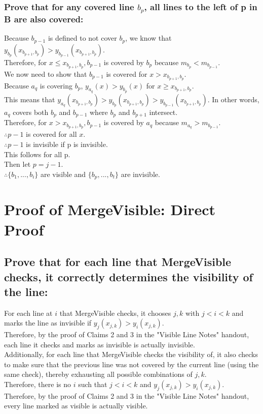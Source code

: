 \documentclass{article}
\begin{document}
    \subsubsection*{Prove that for any covered line $b_{p}$, all lines to the left of p in B are also covered:}
        Because $b_{p-1}$ is defined to not cover $b_p$, we know that $y_{b_{p}}(x_{b_{p+1}, b_{p}}) > y_{b_{p-1}}(x_{b_{p+1}, b_{p}})$.\\
        Therefore, for $x \leq x_{b_{p+1},b_{p}}, b_{p-1}$ is covered by $b_p$ because $m_{b_p} < m_{b_{p-1}}$.\\
        We now need to show that $b_{p-1}$ is covered for $x > x_{b_{p+1},b_{p}}$.\\
        Because $a_q$ is covering $b_p$, $y_{a_{q}}(x) > y_{b_{p}}(x)$ for $x \geq x_{b_{p+1},b_{p}}$.\\
        This means that $y_{a_{q}}(x_{b_{p+1}, b_{p}}) > y_{b_{p}}(x_{b_{p+1}, b_{p}}) > y_{b_{p-1}}(x_{b_{p+1}, b_{p}})$.  In other words, $a_{q}$ covers both $b_{p}$ and $b_{p-1}$ where $b_{p}$ and $b_{p+1}$ intersect.\\
        Therefore, for $x > x_{b_{p+1},b_{p}}, b_{p-1}$ is covered by $a_q$ because $m_{a_q} > m_{b_{p-1}}$.\\
        $\therefore p-1$ is covered for all $x$.\\
        $\therefore p-1$ is invisible if p is invisible.\\
        This follows for all p.\\
        Then let $p = j - 1$.\\
        $\therefore \{b_1,...,b_i\}$ are visible and $\{b_p,...,b_t\}$ are invisible.\\

\section*{Proof of MergeVisible: Direct Proof}

\subsection*{Prove that for each line that MergeVisible checks, it correctly determines the visibility of the line:}
For each line at $i$ that MergeVisible checks, it chooses $j, k$ with $j < i < k$ and marks the line as invisible if $y_j (x_{j,k}) > y_i(x_{j,k})$.\\
Therefore, by the proof of Claims 2 and 3 in the "Visible Line Notes" handout, each line it checks and marks as invisible is actually invisible.\\
Additionally, for each line that MergeVisible checks the visibility of, it also checks to make sure that the previous line was not covered by the current line (using the same check), thereby exhausting all possible combinations of $j, k$.\\
Therefore, there is no $i$ such that $j < i < k$ and $y_j (x_{j,k}) > y_i(x_{j,k})$.\\
Therefore, by the proof of Claims 2 and 3 in the "Visible Line Notes" handout, every line marked as visible is actually visible.
\end{document}
